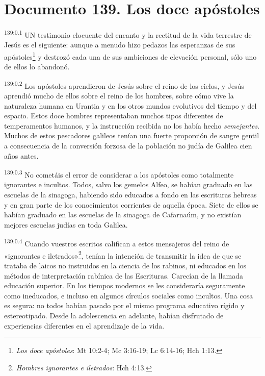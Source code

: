 \chapter{Documento 139. Los doce apóstoles}
\par 
\textsuperscript{139:0.1} UN testimonio elocuente del encanto y la rectitud de la vida terrestre de Jesús es el siguiente: aunque a menudo hizo pedazos las esperanzas de sus apóstoles\footnote{\textit{Los doce apóstoles}: Mt 10:2-4; Mc 3:16-19; Lc 6:14-16; Hch 1:13.} y destrozó cada una de sus ambiciones de elevación personal, sólo uno de ellos lo abandonó.

\par 
\textsuperscript{139:0.2} Los apóstoles aprendieron de Jesús sobre el reino de los cielos, y Jesús aprendió mucho de ellos sobre el reino de los hombres, sobre cómo vive la naturaleza humana en Urantia y en los otros mundos evolutivos del tiempo y del espacio. Estos doce hombres representaban muchos tipos diferentes de temperamentos humanos, y la instrucción recibida no los había hecho \textit{semejantes}. Muchos de estos pescadores galileos tenían una fuerte proporción de sangre gentil a consecuencia de la conversión forzosa de la población no judía de Galilea cien años antes.

\par 
\textsuperscript{139:0.3} No cometáis el error de considerar a los apóstoles como totalmente ignorantes e incultos. Todos, salvo los gemelos Alfeo, se habían graduado en las escuelas de la sinagoga, habiendo sido educados a fondo en las escrituras hebreas y en gran parte de los conocimientos corrientes de aquella época. Siete de ellos se habían graduado en las escuelas de la sinagoga de Cafarnaúm, y no existían mejores escuelas judías en toda Galilea.

\par 
\textsuperscript{139:0.4} Cuando vuestros escritos califican a estos mensajeros del reino de «ignorantes e iletrados»\footnote{\textit{Hombres ignorantes e iletrados}: Hch 4:13.}, tenían la intención de transmitir la idea de que se trataba de laicos no instruidos en la ciencia de los rabinos, ni educados en los métodos de interpretación rabínica de las Escrituras. Carecían de la llamada educación superior. En los tiempos modernos se les consideraría seguramente como ineducados, e incluso en algunos círculos sociales como incultos. Una cosa es segura: no todos habían pasado por el mismo programa educativo rígido y estereotipado. Desde la adolescencia en adelante, habían disfrutado de experiencias diferentes en el aprendizaje de la vida.

